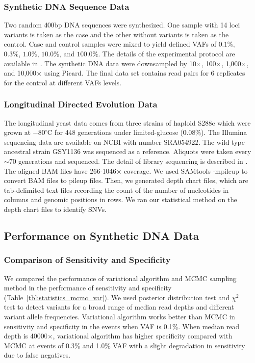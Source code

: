 \documentclass[11pt,reqno]{amsart}
\begin{document}
\subsubsection{Synthetic DNA Sequence Data}
Two random 400bp DNA sequences were synthesized. One sample with 14 loci variants is taken as the case and the other without variants is taken as the control.
Case and control samples were mixed to yield defined VAFs of $0.1\%$, $0.3\%$, $1.0\%$, $10.0\%$, and $100.0\%$.
The details of the experimental protocol are available in \citep{flaherty2011ultrasensitive}.
The synthetic DNA data were downsampled by 10$\times$, 100$\times$, 1,000$\times$, and 10,000$\times$ using Picard.
The final data set contains read pairs for 6 replicates for the control at different VAFs levels.

\subsubsection{Longitudinal Directed Evolution Data}
The longitudinal yeast data comes from three strains of haploid S288c which were grown at $-80^{\circ }\textrm{C}$ for 448 generations under limited-glucose (0.08$\%$).
The Illumina sequencing data are available on NCBI with number SRA054922.
The wild-type ancestral strain GSY1136 was sequenced as a reference.
Aliquots were taken every $\sim$70 generations and sequenced.
The detail of library sequencing is described in \citep{kvitek2013whole, kao2008molecular}.
The aligned BAM files have 266-1046$\times$ coverage.
We used SAMtools -mpileup to convert BAM files to pileup files.
Then, we generated depth chart files, which are tab-delimited text files recording the count of the number of nucleotides in columns and genomic positions in rows.
We ran our statistical method on the depth chart files to identify SNVs.

\subsection{Performance on Synthetic DNA Data}
\subsubsection{Comparison of Sensitivity and Specificity}
We compared the performance of variational algorithm and MCMC sampling method in the performance of sensitivity and specificity (Table~\ref{tbl:statistics_mcmc_var}).
We used posterior distribution test and $\chi^2$ test to detect variants for a broad range of median read depths and different variant allele frequencies.
Variational algorithm works better than MCMC in sensitivity and specificity in the events when VAF is 0.1\%.
When median read depth is 40000$\times$, variational algorithm has higher specificity compared with MCMC at events of 0.3\% and 1.0\% VAF with a slight degradation in sensitivity due to false negatives.
\end{document}
